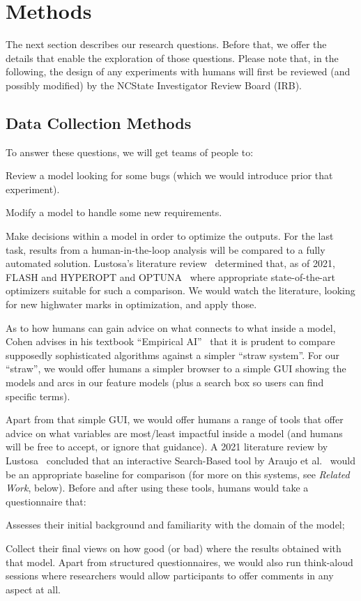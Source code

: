 \section{Methods}\label{rqs}

 The next section describes our research questions.
Before that, we offer the details that   enable
the exploration of those questions.  
Please
note that, in the following,
the design of any experiments with humans  will first be reviewed (and possibly modified)  by the NCState Investigator Review Board (IRB).

\subsection{Data Collection Methods}\label{collect}

To answer these questions,  we will get teams of people to:
\bi
\item Review a model looking for some bugs (which we would introduce prior that experiment).
\item Modify a model to handle some new requirements. 
\item Make decisions within a model in order to optimize the outputs.
\ei
For the last task, results from a human-in-the-loop analysis will be compared to a fully
automated solution. 
Lustosa's   literature review~\cite{lustosa21} determined that, as of 2021,    
FLASH and HYPEROPT and OPTUNA~\cite{bergstra2015hyperopt,nair18,akiba2019optuna} where
appropriate state-of-the-art optimizers suitable for such a comparison. We would watch the literature,
looking for new highwater marks in optimization, and apply those.

As to how humans can gain advice on what connects to what inside a model,
Cohen advises in his textbook ``Empirical AI''~\cite{Cohen95} that it is prudent
to compare supposedly sophisticated algorithms against  
a simpler ``straw system''. For our ``straw'', we would offer humans a simpler browser to a simple GUI showing the models and arcs in our feature models (plus a search box so users can find specific terms).

Apart from that simple GUI, we would  offer humans a range of tools
that offer advice on what variables are most/least impactful inside a model 
(and humans will be free to accept, or ignore that guidance).
A 2021 literature review by Lustosa~\cite{lustosa21} concluded that an
   interactive Search-Based  tool  by Araujo et al.~\cite{araujo2017architecture}
would be an appropriate baseline for comparison (for more on this systems, see {\em Related Work}, below).
Before and after using these tools, humans would take a questionnaire that:
\bi
\item Assesses their initial background   and familiarity with the domain of the model;
\item
Collect their final
views on how good (or bad) where the  results obtained with that model.
\ei 
Apart from structured questionnaires, we would also run think-aloud sessions where researchers would allow participants to offer comments in any aspect   at all.

